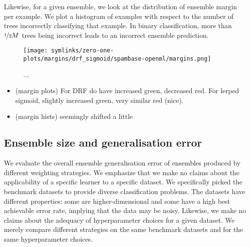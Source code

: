 \documentclass[../main.tex]{subfiles}
\begin{document}
Likewise, for a given ensemble, we look at the distribution of ensemble margin per example. We plot a histogram of examples with respect to the number of trees incorrectly classifying that example. In binary classification, more than $\nicefrac{1}{2}M$ trees being incorrect leads to an incorrect ensemble prediction. %

\begin{figure*}
    \texttt{[image: symlinks/zero-one-plots/margins/drf\_sigmoid/spambase-openml/margins.png]}
    \caption{
        ...
    }
    \label{fig:margins}
\end{figure*}

\begin{observation} %
    \begin{itemize}
        \item (margin plots) For DRF do have increased green, decreased red. For lerped sigmoid, slightly increased green, very similar red (nice).
        \item (margin hists) seemingly shifted a little
    \end{itemize}
\end{observation}

\subsection{Ensemble size and generalisation error}

We evaluate the overall ensemble generalisation error of ensembles produced by different weighting strategies. We emphasize that we make no claims about the applicability of a specific learner to a specific dataset. We specifically picked the benchmark datasets to provide diverse classification problems. The datasets have different properties: some are higher-dimensional and some have a high best achievable error rate, implying that the data may be noisy. Likewise, we make no claims about the adequacy of hyperparameter choices for a given dataset. 
We merely compare different strategies on the same benchmark datasets and for the same hyperparameter choices.
\end{document}

